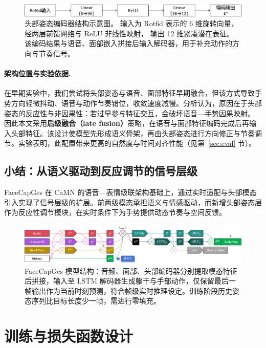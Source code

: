 \begin{figure}[h!t]
\centering
\includegraphics[width=0.8\linewidth]{figures/Fig_headencoder.png}
\caption{头部姿态编码器结构示意图。
输入为 Rot6d 表示的 6 维旋转向量，经两层前馈网络与 ReLU 非线性映射，
输出 12 维紧凑潜在表征。
该编码结果与语音、面部嵌入拼接后输入解码器，用于补充动作的方向与节奏信号。}
\label{fig_headencoder}
\end{figure}

\paragraph{架构位置与实验依据.}
在早期实验中，我们尝试将头部姿态与语音、面部特征早期融合，但该方式导致手势方向轻微抖动、语音与动作节奏错位，收敛速度减慢。分析认为，原因在于头部姿态的反应性与非因果性：若过早参与特征交互，会破坏语音—手势因果映射。  
因此本文采用\textbf{后级融合（late fusion）}策略，在语音与面部特征编码完成后再输入头部特征。该设计使模型先形成语义骨架，再由头部姿态进行方向修正与节奏调节。实验表明，此配置带来更高的自然度与时间对齐性能（见第~\ref{sec:eval} 节）。

\subsection{小结：从语义驱动到反应调节的信号层级}

FaceCapGes 在 CaMN 的语音—表情级联架构基础上，通过实时适配与头部模态引入实现了信号层级的扩展。前两级模态承担语义与情感驱动，而新增头部姿态层作为反应性调节模块，在实时条件下为手势提供动态节奏与空间反馈。

\begin{figure}[h!t]
\centering
\includegraphics[width=\textwidth]{figures/Fig1.png}
\caption{FaceCapGes 模型结构：音频、面部、头部编码器分别提取模态特征后拼接，输入至 LSTM 解码器生成躯干与手部动作，仅保留最后一帧输出作为当前时刻预测，符合帧级实时推理设定。训练阶段历史姿态序列比目标长度少一帧，需进行零填充。}
\label{fig1_}
\end{figure}

\section{训练与损失函数设计}

